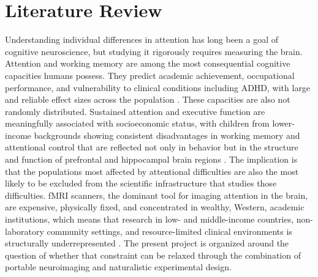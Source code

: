 \section*{Literature Review}

Understanding individual differences in attention has long been a goal of cognitive
neuroscience, but studying it rigorously requires measuring the brain. Attention and
working memory are among the most consequential cognitive capacities humans possess.
They predict academic achievement, occupational performance, and vulnerability to
clinical conditions including ADHD, with large and reliable effect sizes across the
population \parencite{kofler2013}. These capacities are also not randomly distributed.
Sustained attention and executive function are meaningfully associated with socioeconomic
status, with children from lower-income backgrounds showing consistent disadvantages in
working memory and attentional control that are reflected not only in behavior but in the
structure and function of prefrontal and hippocampal brain regions \parencite{farah2006,
noble2015}. The implication is that the populations most affected by attentional
difficulties are also the most likely to be excluded from the scientific infrastructure
that studies those difficulties. fMRI scanners, the dominant tool for imaging attention
in the brain, are expensive, physically fixed, and concentrated in wealthy, Western,
academic institutions, which means that research in low- and middle-income countries,
non-laboratory community settings, and resource-limited clinical environments is
structurally underrepresented \parencite{burns2019}. The present project is organized
around the question of whether that constraint can be relaxed through the combination of
portable neuroimaging and naturalistic experimental design.

